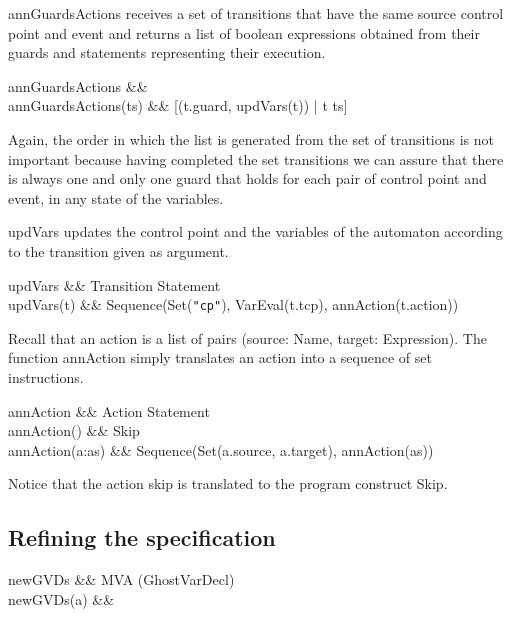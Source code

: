 \documentclass[a4paper,10pt]{article}
\begin{document}
\bigskip
\<annGuardsActions\> receives a set of transitions that have the same source control point and event and
returns a list of boolean expressions obtained from their guards and statements representing their execution.
\begin{haskell}\label{def:annGuardsActions}
annGuardsActions &\ofType& \Delta {}\\
annGuardsActions(ts) &\eqdef& [(t.guard, updVars(t)) | t \in ts]
\end{haskell}
Again, the order in which the list is generated from the set of transitions is not important because having
completed the set transitions we can assure that there is always one and only one guard that holds for each
pair of control point and event, in any state of the variables.

\bigskip
\<updVars\> updates the control point and the variables of the automaton according to the transition given as
argument.
\begin{haskell}\label{def:updVars}
updVars &\ofType& Transition \to Statement\\
updVars(t) &\eqdef& Sequence(Set(\texttt{"cp"}), VarEval(t.tcp), annAction(t.action))
\end{haskell}

\bigskip
Recall that an action is a list of pairs (\<source: Name, target: Expression\>). The function \<annAction\>
simply translates an action into a sequence of set instructions.
\begin{haskell}\label{def:annAction}
annAction &\ofType& Action \to Statement\\
annAction(\emptylist) &\eqdef& Skip\\
annAction(a:as) &\eqdef& Sequence(Set(a.source, a.target), annAction(as))
\end{haskell}

Notice that the action \<skip\> is translated to the program construct \<Skip\>.

\subsection{Refining the specification}

\begin{haskell}
newGVDs &\ofType& MVA \to \powerset(GhostVarDecl)\\
newGVDs(a) &\eqdef&
\end{haskell}
\end{document}
